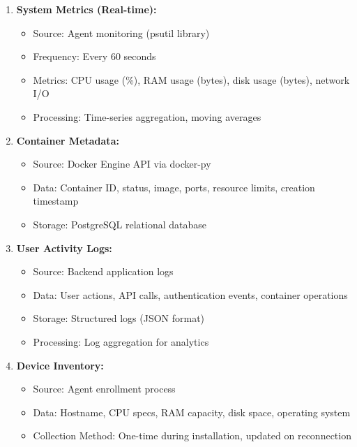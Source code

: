 \documentclass[12pt,a4paper]{article}
\begin{document}
\begin{enumerate}[noitemsep]
    \item \textbf{System Metrics (Real-time):}
    \begin{itemize}[noitemsep]
        \item Source: Agent monitoring (psutil library)
        \item Frequency: Every 60 seconds
        \item Metrics: CPU usage (\%), RAM usage (bytes), disk usage (bytes), network I/O
        \item Processing: Time-series aggregation, moving averages
    \end{itemize}
    
    \item \textbf{Container Metadata:}
    \begin{itemize}[noitemsep]
        \item Source: Docker Engine API via docker-py
        \item Data: Container ID, status, image, ports, resource limits, creation timestamp
        \item Storage: PostgreSQL relational database
    \end{itemize}
    
    \item \textbf{User Activity Logs:}
    \begin{itemize}[noitemsep]
        \item Source: Backend application logs
        \item Data: User actions, API calls, authentication events, container operations
        \item Storage: Structured logs (JSON format)
        \item Processing: Log aggregation for analytics
    \end{itemize}
    
    \item \textbf{Device Inventory:}
    \begin{itemize}[noitemsep]
        \item Source: Agent enrollment process
        \item Data: Hostname, CPU specs, RAM capacity, disk space, operating system
        \item Collection Method: One-time during installation, updated on reconnection
    \end{itemize}
\end{enumerate}
\end{document}
